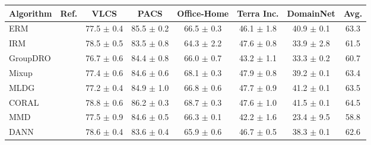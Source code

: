 \begin{table*}[t]
\footnotesize
\centering
\begin{tabular}{llcccccc}
\toprule
\textbf{Algorithm}  & \textbf{Ref.}       & \textbf{VLCS}             & \textbf{PACS}             & \textbf{Office-Home}       & \textbf{Terra Inc.}   & \textbf{DomainNet}        & \textbf{Avg.}              \\
\midrule
ERM                       & \citep{vapnik1998statistical}            & 77.5 $\pm$ 0.4            & 85.5 $\pm$ 0.2            & 66.5 $\pm$ 0.3            & 46.1 $\pm$ 1.8            & 40.9 $\pm$ 0.1            & 63.3                     \\
IRM                       & \citep{arjovsky2019invariant}             & 78.5 $\pm$ 0.5            & 83.5 $\pm$ 0.8            & 64.3 $\pm$ 2.2            & 47.6 $\pm$ 0.8            & 33.9 $\pm$ 2.8            & 61.5                      \\
GroupDRO                  & \citep{sagawa2019distributionally}        & 76.7 $\pm$ 0.6            & 84.4 $\pm$ 0.8            & 66.0 $\pm$ 0.7            & 43.2 $\pm$ 1.1            & 33.3 $\pm$ 0.2            & 60.7                      \\
Mixup                     & \citep{yan2020improve}            & 77.4 $\pm$ 0.6            & 84.6 $\pm$ 0.6            & 68.1 $\pm$ 0.3            & 47.9 $\pm$ 0.8            & 39.2 $\pm$ 0.1            & 63.4                      \\
MLDG                      & \citep{LiYSH18}            & 77.2 $\pm$ 0.4            & 84.9 $\pm$ 1.0            & 66.8 $\pm$ 0.6            & 47.7 $\pm$ 0.9            & 41.2 $\pm$ 0.1            & 63.5                      \\
CORAL                     &  \citep{SunS16}             & 78.8 $\pm$ 0.6            & 86.2 $\pm$ 0.3            & 68.7 $\pm$ 0.3            & 47.6 $\pm$ 1.0            & 41.5 $\pm$ 0.1            & 64.5                      \\
MMD                       & \citep{LiPWK18}           & 77.5 $\pm$ 0.9            & 84.6 $\pm$ 0.5            & 66.3 $\pm$ 0.1            & 42.2 $\pm$ 1.6            & 23.4 $\pm$ 9.5            & 58.8                      \\
DANN                      & \citep{GaninUAGLLML16}         & 78.6 $\pm$ 0.4            & 83.6 $\pm$ 0.4            & 65.9 $\pm$ 0.6            & 46.7 $\pm$ 0.5            & 38.3 $\pm$ 0.1            & 62.6                      \\

\end{tabular}
\end{table*}
